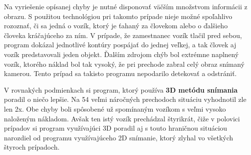Na vyriešenie opísanej chyby je nutné disponovať väčším množstvom informácii z obrazu. S použitou technológiou pri takomto prípade nieje možné spoľahlivo rozoznať, či sa jedná o vozík, ktorý je ťahaný za človekom alebo o ďalšieho človeka kráčajúceho za ním. V prípade, že zamestnanec vozík tlačil pred sebou, program dokázal jednotlivé kontúry pospájať do jednej veľkej, a tak človek aj vozík predstavovali jeden objekt. Ďalším zdrojom chýb bol extrémne naplnený vozík, ktorého náklad bol tak vysoký, že pri prechode zabral celý obraz snímaný kamerou. Tento prípad sa takisto programu nepodarilo detekovať a odstrániť.

V rovnakých podmienkach si program, ktorý používa \textbf{3D metódu snímania} poradil o niečo lepšie. Na 54 veľmi náročných prechodoch situáciu vyhodnotil zle len 2x. Obe chyby boli spôsobené už spomínaným vozíkom s veľmi vysoko naloženým nákladom. Avšak ten istý vozík prechádzal štyrikrát, čiže v polovici prípadov si program využívajúci 3D poradil aj s touto hraničnou situáciou narozdiel od programu využívajúceho 2D snímanie, ktorý zlyhal vo všetkých štyroch prípadoch. 

